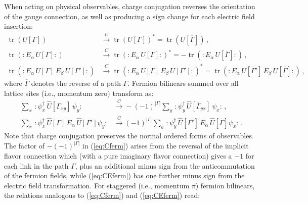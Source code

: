 \documentclass [12pt]{article}
\newcommand{\tr}{\mathop{\mathrm{tr}}}
\begin{document}
When acting on physical observables, charge conjugation reverses the orientation
of the gauge connection, as well as producing a sign change for each
electric field insertion:
\begin{subequations}
\begin{align}
    \tr(U[\Gamma])
    &\xrightarrow{C}
    \tr(U[\Gamma])^*
    =
    \tr(U[\overline\Gamma]) \,,
\\[3pt]
    \tr({:} E_\alpha \, U[\Gamma]{:})
    &\xrightarrow{C}
    \tr({:} E_\alpha \, U[\Gamma]{:})^*
    =
    -\tr({:} E_\alpha \, U[\overline\Gamma]{:}) \,,
\\[3pt]
    \tr({:}E_\alpha \, U[\Gamma] \, E_\beta \, U[\Gamma']{:})
    &\xrightarrow{C}
    \tr({:}E_\alpha \, U[\Gamma] \, E_\beta \, U[\Gamma']{:})^*
    =
    \tr({:}E_\alpha \, U[\overline\Gamma'] \, E_\beta \, U[\overline\Gamma]{:}) \,,
\end{align}
\end{subequations}
where $\overline\Gamma$ denotes the reverse of a path $\Gamma$.
Fermion bilinears summed over all lattice sites (i.e., momentum zero) transform as:
\begin{subequations}\label{eq:Cfermobs}
\begin{align}
    \sum_x \,
    {:} \psi_x^\dagger \, \hat U[\Gamma_{xy}] \, \psi_y {:}
    &\xrightarrow{C}
    -(-1)^{|\Gamma|}
    \sum_y \,
    {:} \psi_y^\dagger \, \hat U[\overline\Gamma_{yx}] \,
	\psi_x {:} \,,
    \label{eq:Cferm}
\\
    \sum_x \,
    {:} \psi_x^\dagger \, \hat U[\Gamma] \, E_\alpha \, \hat U[\Gamma'] \psi_y {:}
    &\xrightarrow{C}
    (-1)^{|\Gamma|}
    \sum_y \,
    {:} \psi_y^\dagger \, \hat U[\overline\Gamma'] \,
	E_\alpha \, \hat U[\overline\Gamma] \psi_x {:} \,.
    \label{eq:CEferm}
\end{align}
\end{subequations}
Note that charge conjugation preserves the normal ordered forms of observables.
The factor of $-(-1)^{|\Gamma|}$ in (\ref{eq:Cferm})
arises from the reversal of the implicit flavor connection which
(with a pure imaginary flavor connection) gives a $-1$ for each link
in the path $\Gamma$, plus an additional minus sign from the
anticommutation of the fermion fields, while
(\ref{eq:CEferm}) has one further minus sign from the electric field
transformation.
%
For staggered (i.e., momentum $\pi$) fermion bilinears, the relations
analogous to (\ref{eq:Cferm}) and (\ref{eq:CEferm}) read:
\end{document}
